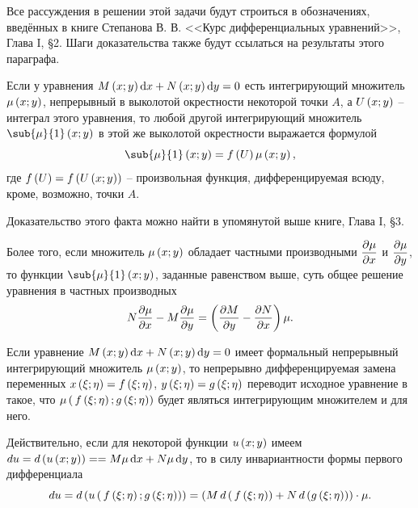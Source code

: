 \documentclass[a5paper,10pt]{article}
\begin{document}
Все рассуждения в решении этой задачи будут строиться в обозначениях, введённых в книге
Степанова В. В. <<Курс дифференциальных уравнений>>, Глава I, \S 2. 
Шаги доказательства также будут ссылаться на результаты этого параграфа.

\begin{framed}
    \begin{property}
        Если у уравнения
        $M\br{x; y} \di x + N\br{x; y} \di y = 0$
        есть интегрирующий множитель $\mu\left(\hspace{0.01em}x; y\hspace{0.01em}\right)$,
        непрерывный в выколотой окрестности некоторой точки $A$, а $U\left(\hspace{0.01em}x; y\hspace{0.01em}\right)$ -- интеграл 
        этого уравнения, то любой другой интегрирующий множитель $\sub{\mu}{1}\br{x; y}$ в этой же
        выколотой окрестности выражается формулой
        $$\sub{\mu}{1}\br{x; y} = f\br{U} \mu\br{x; y},$$
        где $f\left(\hspace{0.01em}U\hspace{0.01em}\right) = f\left(\hspace{0.01em}U\left(\hspace{0.01em}x; y\hspace{0.01em}\right)\hspace{0.01em}\right)$ -- произвольная функция, дифференцируемая всюду, кроме,
        возможно, точки $A$.
    \end{property}

    Доказательство этого факта можно найти в упомянутой выше книге, Глава I, \S 3.

    Более того, если множитель $\mu\left(\hspace{0.01em}x; y\hspace{0.01em}\right)$ обладает частными производными 
    $\dfrac{\partial \mu}{\partial x}$ и $\dfrac{\partial \mu}{\partial y}$, то функции $\sub{\mu}{1}\br{x; y}$, заданные равенством выше,
    суть общее решение уравнения в частных производных
    $$N \dfrac{\partial \mu}{\partial x} - M \dfrac{\partial \mu}{\partial y} = \left(\hspace{0.01em}\dfrac{\partial M}{\partial y} - \dfrac{\partial N}{\partial x}\hspace{0.01em}\right) \mu.$$
\end{framed}

\begin{framed}
    \begin{property} \hspace{1mm}
        Если уравнение $M\br{x; y} \di x + N\br{x; y} \di y = 0$ имеет формальный непрерывный
        интегрирующий множитель
        $\mu\left(\hspace{0.01em}x; y\hspace{0.01em}\right)$,
        то непрерывно дифференцируемая замена переменных
        $x\left(\hspace{0.01em}\xi; \eta\hspace{0.01em}\right) = f\left(\hspace{0.01em}\xi; \eta\hspace{0.01em}\right)$, $y\left(\hspace{0.01em}\xi; \eta\hspace{0.01em}\right) = g\left(\hspace{0.01em}\xi; \eta\hspace{0.01em}\right)$
        переводит исходное уравнение в такое, что
        $\mu\left(\hspace{0.01em}\,f\left(\hspace{0.01em}\xi; \eta\hspace{0.01em}\right); g\left(\hspace{0.01em}\xi; \eta\hspace{0.01em}\right)\hspace{0.01em}\right)$
        будет являться интегрирующим множителем и для него.
    \end{property}

    Действительно, если для некоторой функции $u\left(\hspace{0.01em}x; y\hspace{0.01em}\right)$ имеем 
    $du = d\br{u\br{x; y}} = \linebreak = M\mu \di x + N \mu \di y$,
    то в силу инвариантности формы первого дифференциала
    $$du = d\left(\hspace{0.01em}u\left(\hspace{0.01em}\,f\left(\hspace{0.01em}\xi; \eta\hspace{0.01em}\right); g\left(\hspace{0.01em}\xi; \eta\hspace{0.01em}\right)\hspace{0.01em}\right)\hspace{0.01em}\right) =
    \left(\hspace{0.01em}M\, d\left(\hspace{0.01em}\,f\left(\hspace{0.01em}\xi; \eta\hspace{0.01em}\right)\hspace{0.01em}\right) + N\, d\left(\hspace{0.01em}g\left(\hspace{0.01em}\xi; \eta\hspace{0.01em}\right)\hspace{0.01em}\right)\hspace{0.01em}\right) \cdot \mu.$$
\end{framed}
\pagebreak
\end{document}
